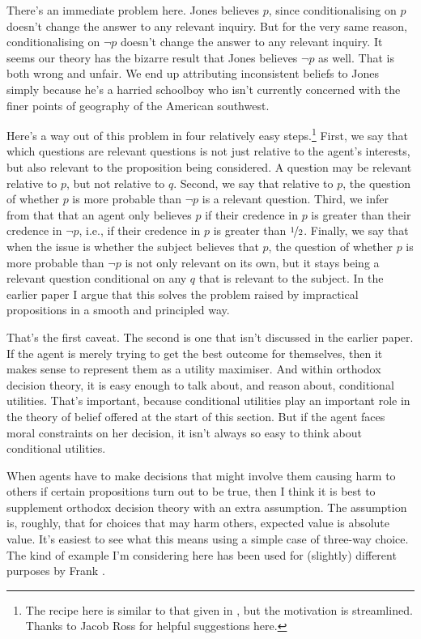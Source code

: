 There's an immediate problem here. Jones believes $p$, since conditionalising on $p$ doesn't change the answer to any relevant inquiry. But for the very same reason, conditionalising on $\neg p$ doesn't change the answer to any relevant inquiry. It seems our theory has the bizarre result that Jones believes $\neg p$ as well. That is both wrong and unfair. We end up attributing inconsistent beliefs to Jones simply because he's a harried schoolboy who isn't currently concerned with the finer points of geography of the American southwest.

Here's a way out of this problem in four relatively easy steps.\footnote{The recipe here is similar to that given in \citet{Weatherson2005-WEACWD}, but the motivation is streamlined. Thanks to Jacob Ross for helpful suggestions here.} First, we say that which questions are relevant questions is not just relative to the agent's interests, but also relevant to the proposition being considered. A question may be relevant relative to $p$, but not relative to $q$. Second, we say that relative to $p$, the question of whether $p$ is more probable than $\neg p$ is a relevant question. Third, we infer from that that an agent only believes $p$ if their credence in $p$ is greater than their credence in $\neg p$, i.e., if their credence in $p$ is greater than $\nicefrac{1}{2}$. Finally, we say that when the issue is whether the subject believes that $p$, the question of whether $p$ is more probable than $\neg p$ is not only relevant on its own, but it stays being a relevant question conditional on any $q$ that is relevant to the subject. In the earlier paper \citep{Weatherson2005-WEACWD} I argue that this solves the problem raised by impractical propositions in a smooth and principled way.

That's the first caveat. The second is one that isn't discussed in the earlier paper. If the agent is merely trying to get the best outcome for themselves, then it makes sense to represent them as a utility maximiser. And within orthodox decision theory, it is easy enough to talk about, and reason about, conditional utilities. That's important, because conditional utilities play an important role in the theory of belief offered at the start of this section. But if the agent faces moral constraints on her decision, it isn't always so easy to think about conditional utilities.

When agents have to make decisions that might involve them causing harm to others if certain propositions turn out to be true, then I think it is best to supplement orthodox decision theory with an extra assumption. The assumption is, roughly, that for choices that may harm others, expected value is absolute value. It's easiest to see what this means using a simple case of three-way choice. The kind of example I'm considering here has been used for (slightly) different purposes by Frank \citet{Jackson1991}. 

